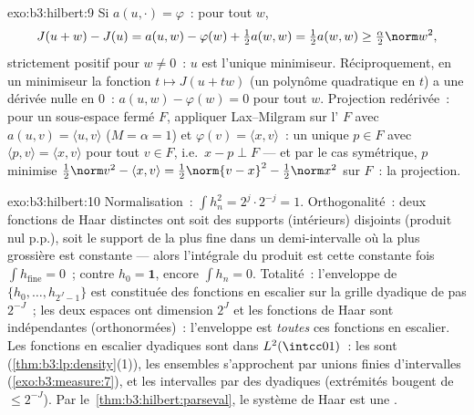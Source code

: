 \begin{solution}{exo:b3:hilbert:9}
Si $a(u, \cdot) = \varphi$~: pour tout $w$,
\[
J(u + w) - J(u) = a(u, w) - \varphi(w) + \tfrac12a(w,w)
= \tfrac12a(w,w) \geq \tfrac\alpha2\norm w^2,
\]
strictement positif pour $w \neq 0$~: $u$ est l'unique
minimiseur. Réciproquement, en un minimiseur la fonction $t
\mapsto J(u + tw)$ (un polynôme quadratique en $t$) a une
dérivée nulle en $0$~: $a(u, w) - \varphi(w) = 0$ pour tout
$w$. Projection redérivée~: pour un sous-espace fermé $F$,
appliquer Lax--Milgram sur l' $F$ avec
$a(u,v) = \langle u, v\rangle$ ($M = \alpha = 1$) et
$\varphi(v) = \langle x, v\rangle$~: un unique $p \in F$ avec
$\langle p, v\rangle = \langle x, v\rangle$ pour tout $v \in
F$, i.e.\ $x - p \perp F$ --- et par le cas symétrique, $p$
minimise $\frac12\norm v^2 - \langle x, v\rangle =
\frac12\norm{v - x}^2 - \frac12\norm x^2$ sur $F$~: la
projection.
\end{solution}

\begin{solution}{exo:b3:hilbert:10}
Normalisation~: $\int h_n^2 = 2^j\cdot 2^{-j} = 1$.
Orthogonalité~: deux fonctions de Haar distinctes ont soit des
supports (intérieurs) disjoints (produit nul p.p.), soit le
support de la plus fine  dans un demi-intervalle où la
plus grossière est constante --- alors l'intégrale du produit
est cette constante fois $\int h_{\text{fine}} = 0$~; contre
$h_0 = \mathbf 1$, encore $\int h_n = 0$. Totalité~: l'enveloppe
de $\{h_0, \dots, h_{2^J-1}\}$ est constituée des fonctions en
escalier sur la grille dyadique de pas $2^{-J}$~; les deux
espaces ont dimension $2^J$ et les fonctions de Haar sont
indépendantes (orthonormées)~: l'enveloppe est \emph{toutes}
ces fonctions en escalier. Les fonctions en escalier dyadiques
sont  dans $L^2(\intcc01)$~: les  sont
 (\cref{thm:b3:lp:density}(1)), les ensembles
 s'approchent par unions finies d'intervalles
(\cref{exo:b3:measure:7}), et les intervalles par des
dyadiques (extrémités bougent de $\leq 2^{-J}$). Par
le~\cref{thm:b3:hilbert:parseval}, le système de Haar est une
.
\end{solution}

